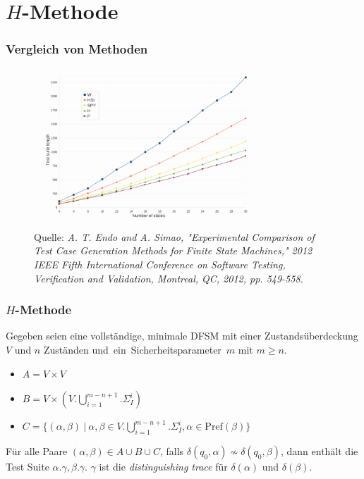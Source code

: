 \section{$H$-Methode}
\begin{frame}
  \frametitle{Vergleich von Methoden}
  \begin{figure}
	  \caption{Quelle: \emph{A. T. Endo and A. Simao, "Experimental Comparison of Test Case Generation Methods for Finite State Machines," 2012 IEEE Fifth International Conference on Software Testing, Verification and Validation, Montreal, QC, 2012, pp. 549-558.} }
	  \centering
	  \includegraphics[width=0.85\textwidth]{images/methodComparison}
	\end{figure}

\end{frame}

\begin{frame}
  \frametitle{$H$-Methode}
  Gegeben seien eine vollständige, minimale DFSM mit einer Zustandsüberdeckung $V$ und $n$ Zuständen und~ein~Sicherheitsparameter~$m$ mit $m \geq n$.
  \begin{itemize}
    \item $A=V\times V$
  	\item $B=V\times (V.\bigcup\limits_{i=1}^{m-n+1}.\Sigma_I^i)$
  	\item $C=\{(\alpha,\beta)~|~\alpha,\beta\in V.\bigcup\limits_{i=1}^{m-n+1}.\Sigma_I^i, \alpha \in \text{Pref}(\beta)\}$
  \end{itemize}
  Für alle Paare $(\alpha, \beta) \in A\cup B \cup C$, falls $\delta(q_0,\alpha) \not \sim \delta(q_0,\beta)$, dann enthält die Test Suite $\alpha.\gamma,\beta.\gamma$. $\gamma$ ist die \emph{distinguishing trace} für $\delta(\alpha)$ und $\delta(\beta)$.
\end{frame}

